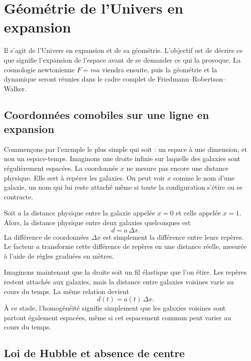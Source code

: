 \chapter{Géométrie de l’Univers en expansion}

Il s’agit de l’Univers en expansion et de sa géométrie. L’objectif est de décrire ce que signifie l’expansion de l’espace avant de se demander ce qui la provoque. La cosmologie newtonienne \(F=ma\) viendra ensuite, puis la géométrie et la dynamique seront réunies dans le cadre complet de Friedmann--Robertson--Walker.

\section{Coordonnées comobiles sur une ligne en expansion}

Commençons par l’exemple le plus simple qui soit : un espace à une dimension, et non un espace-temps. Imaginons une droite infinie sur laquelle des galaxies sont régulièrement espacées. La coordonnée \(x\) ne mesure pas encore une distance physique. Elle sert à repérer les galaxies. On peut voir \(x\) comme le nom d’une galaxie, un nom qui lui reste attaché même si toute la configuration s’étire ou se contracte.

Soit \(a\) la distance physique entre la galaxie appelée \(x=0\) et celle appelée \(x=1\). Alors, la distance physique entre deux galaxies quelconques est
\begin{equation}
d=a\,\Delta x.
\end{equation}
La différence de coordonnées \(\Delta x\) est simplement la différence entre leurs repères. Le facteur \(a\) transforme cette différence de repères en une distance réelle, mesurée à l’aide de règles graduées en mètres.

Imaginons maintenant que la droite soit un fil élastique que l’on étire. Les repères restent attachés aux galaxies, mais la distance entre galaxies voisines varie au cours du temps. La même relation devient
\begin{equation}
d(t)=a(t)\,\Delta x.
\end{equation}
À ce stade, l’homogénéité signifie simplement que les galaxies voisines sont partout également espacées, même si cet espacement commun peut varier au cours du temps.

\section{Loi de Hubble et absence de centre}

